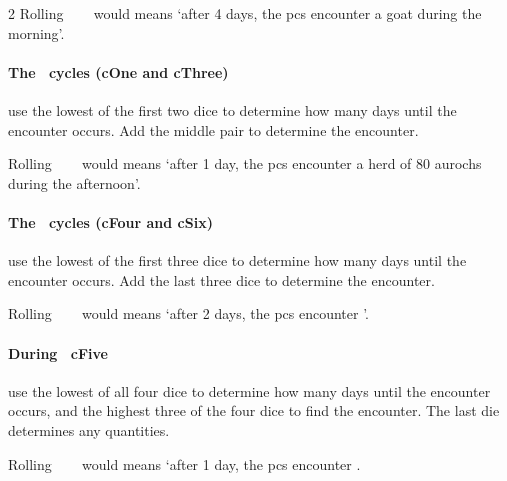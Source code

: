 \begin{multicols}{2}
Rolling ~~~ would means `after 4 days, the \glspl{pc} encounter a goat during the morning'.

\paragraph{The \showTemperature\ \glspl{cycle} (\gls{cOne} and \gls{cThree})}
use the lowest of the first two dice to determine how many days until the encounter occurs.
Add the middle pair to determine the encounter.

Rolling ~~~ would means `after 1 day, the \glspl{pc} encounter a herd of 80 aurochs during the afternoon'.

\paragraph{The \showTemperature\ \glspl{cycle} (\gls{cFour} and \gls{cSix})}
use the lowest of the first three dice to determine how many days until the encounter occurs.
Add the last three dice to determine the encounter.

Rolling ~~~ would means `after 2 days, the \glspl{pc} encounter '.

\paragraph{During \showTemperature\ \gls{cFive}}
use the lowest of all four dice to determine how many days until the encounter occurs, and the highest three of the four dice to find the encounter.
The last die determines any quantities.

Rolling ~~~ would means `after 1 day, the \glspl{pc} encounter .

\end{multicols}
